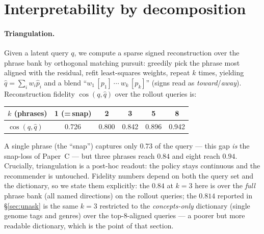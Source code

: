 \documentclass[11pt]{article}
\newcommand{\qhat}{\hat q}
\begin{document}
\section{Interpretability by decomposition}\label{sec:tri}
\paragraph{Triangulation.} Given a latent query $q$, we compute a sparse signed reconstruction over the phrase bank by
orthogonal matching pursuit: greedily pick the phrase most aligned with the residual, refit least-squares weights,
repeat $k$ times, yielding $\qhat=\sum_i w_i \hat p_i$ and a blend ``$w_1\,[p_1]\ \cdots\ w_k\,[p_k]$'' (signs read as
\emph{toward}/\emph{away}). Reconstruction fidelity $\cos(q,\qhat)$ over the rollout queries is:
\begin{center}\small
\begin{tabular}{lccccc}
\toprule
$k$ (phrases) & 1 (=\,snap) & 2 & 3 & 5 & 8\\
\midrule
$\cos(q,\qhat)$ & 0.726 & 0.800 & 0.842 & 0.896 & 0.942\\
\bottomrule
\end{tabular}
\end{center}
A single phrase (the ``snap'') captures only $0.73$ of the query --- this gap \emph{is} the snap-loss of
Paper~C --- but three phrases reach $0.84$ and eight reach $0.94$. Crucially, triangulation is a post-hoc readout: the
policy stays continuous and the recommender is untouched. Fidelity numbers depend on both the query set and the
dictionary, so we state them explicitly: the $0.84$ at $k{=}3$ here is over the \emph{full} phrase bank (all named
directions) on the rollout queries; the $0.814$ reported in \S\ref{sec:unask} is the same $k{=}3$ restricted to the
\emph{concepts-only} dictionary (single genome tags and genres) over the top-$8$-aligned queries --- a poorer but more
readable dictionary, which is the point of that section.
\end{document}
